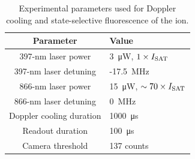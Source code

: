     \begin{table}
        \begin{center}
        \begin{tabular}{|c|l|}
            \hline
            Parameter & Value \\
            \hline
            397-nm laser power & 3~\unit{\uW}, $1\times I_{\rm SAT}$ \\
            397-nm laser detuning & -17.5~\unit{\MHz}\\
            866-nm laser power & 15~\unit{\uW}, $\sim 70\times I_{\rm SAT}$\\
            866-nm laser detuning & 0~\unit{\MHz} \\
            Doppler cooling duration & 1000~\unit{\us}\\
            Readout duration & 100~\unit{\us} \\
            Camera threshold & 137 counts \\
            \hline
        \end{tabular}
        \end{center}
        \caption{
            Experimental parameters used for Doppler cooling and state-selective fluorescence of the ion. 
            }
        \label{tab:397_parameters}
    \end{table}

